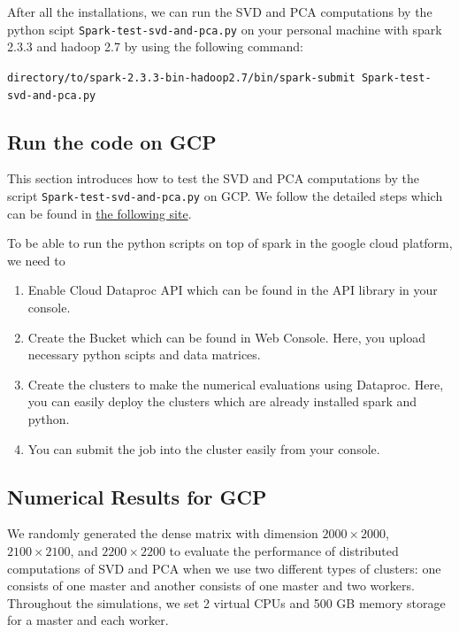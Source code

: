 \documentclass[]{article}
\begin{document}
After all the installations, we can run the SVD and PCA computations by
the python scipt \texttt{Spark-test-svd-and-pca.py} on your personal
machine with spark 2.3.3 and hadoop 2.7 by using the following command:

\texttt{directory/to/spark-2.3.3-bin-hadoop2.7/bin/spark-submit\ Spark-test-svd-and-pca.py}

\hypertarget{run-the-code-on-gcp}{%
\subsection{Run the code on GCP}\label{run-the-code-on-gcp}}

This section introduces how to test the SVD and PCA computations by the
script \texttt{Spark-test-svd-and-pca.py} on GCP. We follow the detailed
steps which can be found in
\href{https://towardsdatascience.com/step-by-step-tutorial-pyspark-sentiment-analysis-on-google-dataproc-fef9bef46468}{the
following site}.

To be able to run the python scripts on top of spark in the google cloud
platform, we need to

\begin{enumerate}
\def\labelenumi{\arabic{enumi}.}
\item
  Enable Cloud Dataproc API which can be found in the API library in
  your console.
\item
  Create the Bucket which can be found in Web Console. Here, you upload
  necessary python scipts and data matrices.
\item
  Create the clusters to make the numerical evaluations using Dataproc.
  Here, you can easily deploy the clusters which are already installed
  spark and python.
\item
  You can submit the job into the cluster easily from your console.
\end{enumerate}

\hypertarget{numerical-results-for-gcp}{%
\subsection{Numerical Results for GCP}\label{numerical-results-for-gcp}}

We randomly generated the dense matrix with dimension
\(2000\times2000\), \(2100\times 2100\), and \(2200\times 2200\) to
evaluate the performance of distributed computations of SVD and PCA when
we use two different types of clusters: one consists of one master and
another consists of one master and two workers. Throughout the
simulations, we set 2 virtual CPUs and 500 GB memory storage for a
master and each worker.
\end{document}
